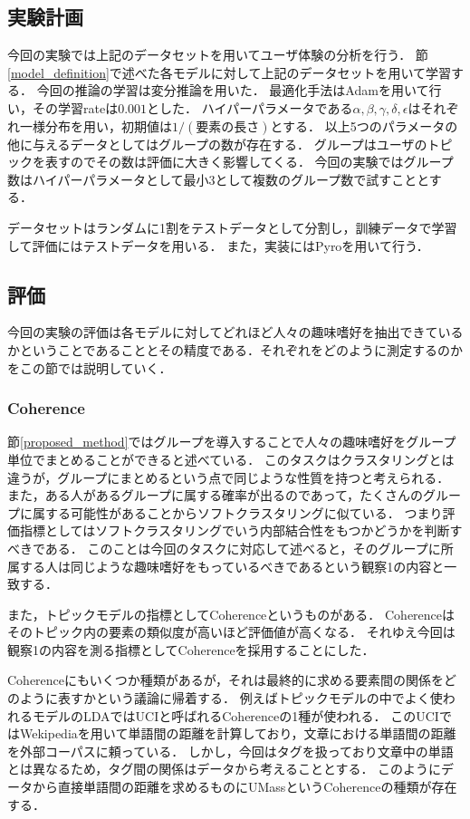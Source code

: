 \documentclass[a4j,10pt, twocolumn]{jarticle}
\begin{document}
\subsection{実験計画} \label{experimental-setting}
今回の実験では上記のデータセットを用いてユーザ体験の分析を行う．
節\ref{model_definition}で述べた各モデルに対して上記のデータセットを用いて学習する．
今回の推論の学習は変分推論を用いた．
最適化手法はAdam\cite{kingma2014adam}を用いて行い，その学習rateは$0.001$とした．
ハイパーパラメータである$\alpha, \beta, \gamma, \delta, \epsilon$はそれぞれ一様分布を用い，初期値は$1/(要素の長さ)$とする．
以上5つのパラメータの他に与えるデータとしてはグループの数が存在する．
グループはユーザのトピックを表すのでその数は評価に大きく影響してくる．
今回の実験ではグループ数はハイパーパラメータとして最小3として複数のグループ数で試すこととする．

データセットはランダムに1割をテストデータとして分割し，訓練データで学習して評価にはテストデータを用いる．
また，実装にはPyroを用いて行う．

\subsection{評価} \label{evaluation}
今回の実験の評価は各モデルに対してどれほど人々の趣味嗜好を抽出できているかということであることとその精度である．それぞれをどのように測定するのかをこの節では説明していく．

\subsubsection{Coherence} \label{coherence}
節\ref{proposed_method}ではグループを導入することで人々の趣味嗜好をグループ単位でまとめることができると述べている．
このタスクはクラスタリングとは違うが，グループにまとめるという点で同じような性質を持つと考えられる．
また，ある人があるグループに属する確率が出るのであって，たくさんのグループに属する可能性があることからソフトクラスタリングに似ている．
つまり評価指標としてはソフトクラスタリングでいう内部結合性をもつかどうかを判断すべきである．
このことは今回のタスクに対応して述べると，そのグループに所属する人は同じような趣味嗜好をもっているべきであるという観察1の内容と一致する．

また，トピックモデルの指標としてCoherence\cite{first-coherence}というものがある．
Coherenceはそのトピック内の要素の類似度が高いほど評価値が高くなる．
それゆえ今回は観察1の内容を測る指標としてCoherenceを採用することにした．

Coherenceにもいくつか種類があるが，それは最終的に求める要素間の関係をどのように表すかという議論に帰着する．
例えばトピックモデルの中でよく使われるモデルのLDA\cite{blei2003latent}ではUCI\cite{newman2010automatic}と呼ばれるCoherenceの1種が使われる．
このUCIではWekipediaを用いて単語間の距離を計算しており，文章における単語間の距離を外部コーパスに頼っている．
しかし，今回はタグを扱っており文章中の単語とは異なるため，タグ間の関係はデータから考えることとする．
このようにデータから直接単語間の距離を求めるものにUMass\cite{mimno2011optimizing}というCoherenceの種類が存在する．
\end{document}
